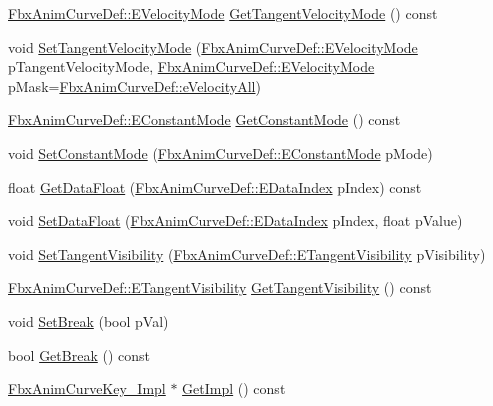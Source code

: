 \begin{DoxyCompactItemize}
\item 
\hyperlink{class_fbx_anim_curve_def_a747576beffa78ab236d2e140da395fff}{Fbx\+Anim\+Curve\+Def\+::\+E\+Velocity\+Mode} \hyperlink{class_fbx_anim_curve_key_af8b7bc72b42857f9a713ca3f443cd55b}{Get\+Tangent\+Velocity\+Mode} () const
\item 
void \hyperlink{class_fbx_anim_curve_key_a758b05baef1e6298833b1ed9e6c11a3e}{Set\+Tangent\+Velocity\+Mode} (\hyperlink{class_fbx_anim_curve_def_a747576beffa78ab236d2e140da395fff}{Fbx\+Anim\+Curve\+Def\+::\+E\+Velocity\+Mode} p\+Tangent\+Velocity\+Mode, \hyperlink{class_fbx_anim_curve_def_a747576beffa78ab236d2e140da395fff}{Fbx\+Anim\+Curve\+Def\+::\+E\+Velocity\+Mode} p\+Mask=\hyperlink{class_fbx_anim_curve_def_a747576beffa78ab236d2e140da395fffab8603ba4ecc238f5dee7489b6a0123ee}{Fbx\+Anim\+Curve\+Def\+::e\+Velocity\+All})
\item 
\hyperlink{class_fbx_anim_curve_def_a52885abd392ac8ac3da94bafc5fddd64}{Fbx\+Anim\+Curve\+Def\+::\+E\+Constant\+Mode} \hyperlink{class_fbx_anim_curve_key_ade9ff492dbe914f25b6a0404d0121a83}{Get\+Constant\+Mode} () const
\item 
void \hyperlink{class_fbx_anim_curve_key_a6a34c333a4b4f90cf04492c9c31bedcb}{Set\+Constant\+Mode} (\hyperlink{class_fbx_anim_curve_def_a52885abd392ac8ac3da94bafc5fddd64}{Fbx\+Anim\+Curve\+Def\+::\+E\+Constant\+Mode} p\+Mode)
\item 
float \hyperlink{class_fbx_anim_curve_key_a3185c35241a072105f14327afd275452}{Get\+Data\+Float} (\hyperlink{class_fbx_anim_curve_def_a3be261d961f8226235529b148cf80300}{Fbx\+Anim\+Curve\+Def\+::\+E\+Data\+Index} p\+Index) const
\item 
void \hyperlink{class_fbx_anim_curve_key_ad61a4843c52e4ba3a21102c577950dc5}{Set\+Data\+Float} (\hyperlink{class_fbx_anim_curve_def_a3be261d961f8226235529b148cf80300}{Fbx\+Anim\+Curve\+Def\+::\+E\+Data\+Index} p\+Index, float p\+Value)
\item 
void \hyperlink{class_fbx_anim_curve_key_af38b131031d26da6038b89c17498f05f}{Set\+Tangent\+Visibility} (\hyperlink{class_fbx_anim_curve_def_a70c49072776ac6b3426c57dd80e16e3b}{Fbx\+Anim\+Curve\+Def\+::\+E\+Tangent\+Visibility} p\+Visibility)
\item 
\hyperlink{class_fbx_anim_curve_def_a70c49072776ac6b3426c57dd80e16e3b}{Fbx\+Anim\+Curve\+Def\+::\+E\+Tangent\+Visibility} \hyperlink{class_fbx_anim_curve_key_ada99141bd5cd9218fe7eaa4ce00ae5db}{Get\+Tangent\+Visibility} () const
\item 
void \hyperlink{class_fbx_anim_curve_key_a688bc80bc9b18052f8bc078293fba426}{Set\+Break} (bool p\+Val)
\item 
bool \hyperlink{class_fbx_anim_curve_key_a3cf927120c152c7a5d8ac258ad7ebc88}{Get\+Break} () const
\item 
\hyperlink{class_fbx_anim_curve_key___impl}{Fbx\+Anim\+Curve\+Key\+\_\+\+Impl} $\ast$ \hyperlink{class_fbx_anim_curve_key_a21427b9606e3bb19b87f1bda1197a5eb}{Get\+Impl} () const
\end{DoxyCompactItemize}
